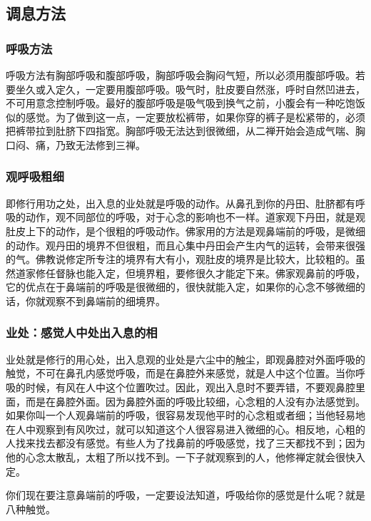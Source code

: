 \documentclass{book}
\begin{document}
\subsection{调息方法}

\subsubsection{呼吸方法}

呼吸方法有胸部呼吸和腹部呼吸，胸部呼吸会胸闷气短，所以必须用腹部呼吸。若要坐久或入定久，一定要用腹部呼吸。吸气时，肚皮要自然涨，呼时自然凹进去，不可用意念控制呼吸。最好的腹部呼吸是吸气吸到换气之前，小腹会有一种吃饱饭似的感觉。为了做到这一点，一定要放松裤带，如果你穿的裤子是松紧带的，必须把裤带拉到肚脐下四指宽。胸部呼吸无法达到很微细，从二禅开始会造成气喘、胸口闷、痛，乃致无法修到三禅。

\subsubsection{观呼吸粗细}

即修行用功之处，出入息的业处就是呼吸的动作。从鼻孔到你的丹田、肚脐都有呼吸的动作，观不同部位的呼吸，对于心念的影响也不一样。道家观下丹田，就是观肚皮上下的动作，是个很粗的呼吸动作。佛家用的方法是观鼻端前的呼吸，是微细的动作。观丹田的境界不但很粗，而且心集中丹田会产生内气的运转，会带来很强的气。佛教说修定所专注的境界有大有小，观肚皮的境界是比较大，比较粗的。虽然道家修任督脉也能入定，但境界粗，要修很久才能定下来。佛家观鼻前的呼吸，它的优点在于鼻端前的呼吸是很微细的，很快就能入定，如果你的心念不够微细的话，你就观察不到鼻端前的细境界。

\subsubsection{业处：感觉人中处出入息的相}

业处就是修行的用心处，出入息观的业处是六尘中的触尘，即观鼻腔对外面呼吸的触觉，不可在鼻孔内感觉呼吸，而是在鼻腔外来感觉，就是人中这个位置。当你呼吸的时候，有风在人中这个位置吹过。因此，观出入息时不要弄错，不要观鼻腔里面，而是在鼻腔外面。因为鼻腔外面的呼吸比较细，心念粗的人没有办法感觉到。如果你叫一个人观鼻端前的呼吸，很容易发现他平时的心念粗或者细；当他轻易地在人中观察到有风吹过，就可以知道这个人很容易进入微细的心。相反地，心粗的人找来找去都没有感觉。有些人为了找鼻前的呼吸感觉，找了三天都找不到；因为他的心念太散乱，太粗了所以找不到。一下子就观察到的人，他修禅定就会很快入定。

你们现在要注意鼻端前的呼吸，一定要设法知道，呼吸给你的感觉是什么呢？就是八种触觉。
\end{document}
